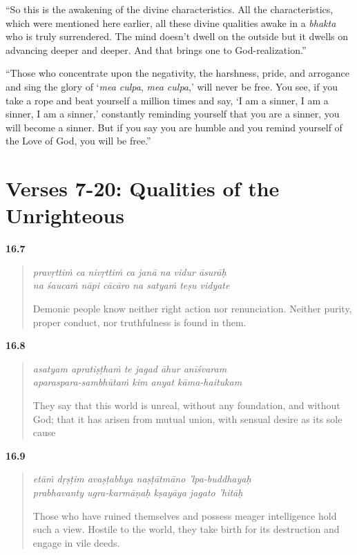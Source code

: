 \enquote{So this is the awakening of the divine characteristics. All the characteristics, which were mentioned here earlier, all these divine qualities awake in a \textit{bhakta} who is truly surrendered. The mind doesn’t dwell on the outside but it dwells on advancing deeper and deeper. And that brings one to God-realization.}

\enquote{Those who concentrate upon the negativity, the harshness, pride, and arrogance and sing the glory of \enquote{\textit{mea culpa}, \textit{mea culpa},} will never be free. You see, if you take a rope and beat yourself a million times and say, \enquote{I am a sinner, I am a sinner, I am a sinner,} constantly reminding yourself that you are a sinner, you will become a sinner. But if you say you are humble and you remind yourself of the Love of God, you will be free.}

\section{Verses 7-20: Qualities of the Unrighteous}\label{sec-verses-7-20-qualities-of-the-unrighteous}

\par\noindent\textbf{16.7}\par
\begin{verse}
\textit{pravṛttiṁ ca nivṛttiṁ ca janā na vidur āsurāḥ} \\
\textit{na śaucaṁ nāpi cācāro na satyaṁ teṣu vidyate}

\noindent Demonic people know neither right action nor renunciation. Neither purity, proper conduct, nor truthfulness is found in them.
\end{verse}
\par



\par\noindent\textbf{16.8}\par
\begin{verse}
\textit{asatyam apratiṣṭhaṁ te jagad āhur anīśvaram} \\
\textit{aparaspara-sambhūtaṁ kim anyat kāma-haitukam}

\noindent They say that this world is unreal, without any foundation, and without God; that it has arisen from mutual union, with sensual desire as its sole cause
\end{verse}
\par



\par\noindent\textbf{16.9}\par
\begin{verse}
\textit{etāṁ dṛṣṭim avaṣṭabhya naṣṭātmāno ’lpa-buddhayaḥ} \\
\textit{prabhavanty ugra-karmāṇaḥ kṣayāya jagato ’hitāḥ}

\noindent Those who have ruined themselves and possess meager intelligence hold such a view. Hostile to the world, they take birth for its destruction and engage in vile deeds.
\end{verse}
\par



